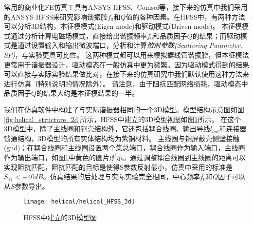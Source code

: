 常用的商业化FE仿真工具有ANSYS HFSS、Comsol等，接下来的仿真中我们采用的ANSYS HFSS来研究影响谐振腔$f_0$和$Q$值的各种因素。在HFSS中，有两种方法可以分析3D结构，本征模模式(Eigen-mode)和驱动模式(Driven-mode)。
本征模模式通过分析计算电磁场模式，直接给出谐振频率$f_0$和品质因子$Q$的结果；而驱动模式是通过设置输入和输出微波端口，分析和计算\emph{散射参数(Scattering Parameter, SP)}，与实验更具可比性。
这两种模式都可以用来模拟螺线管谐振腔，但本征模法更常用于谐振器设计，驱动模态在一般仿真中更为频繁。因为驱动模式得到的结果可以直接与实际实验结果做比对，在接下来的仿真研究中我们默认使用这种方法来进行仿真（特别说明的情况除外）。
请注意，由于阻抗匹配网络损耗\cite[]{Gandolfi_Niedermayr_Kumph_Brownnutt_Blatt_2012}，驱动模态中品质因子$Q$的结果大约是本征模结果的一半。

我们在仿真软件中构建了与实际谐振器相同的一个3D模型。模型结构示意图如图\ref{fig:helical_structure_2d}所示，HFSS中建立的3D模型视图如图\ref{fig:helical_HFSS_3d}所示。
在这个3D模型中，除了主线圈和铜壳结构外，它还包括耦合线圈、输出导线$l_{out}$和连接器馈通结构，3D模型的所有实体结构均为紫铜材料。
主线圈与铜屏蔽壳侧壁接触(gnd)；在耦合线圈和主线圈设置两个集总端口，耦合线圈作为输入端口，主线圈作为输出端口，如图\ref{fig:helical_HFSS_3d}中黄色的圆片所示。通过调整耦合线圈到主线圈的距离可以实现阻抗匹配，阻抗匹配的目标是使得S参数反射最小，仿真中采用的标准是$S_{11}<-40dB$。仿真结果的后处理与实际实验完全相同，中心频率$f_0$和$Q$因子可以从$S$参数导出。

\begin{figure}
    \centering
    \caption[HFSS中建立的3D模型图]{HFSS中建立的3D模型图\label{fig:helical_HFSS_3d}}
    \texttt{[image: helical/helical\_HFSS\_3d]}
\end{figure}

